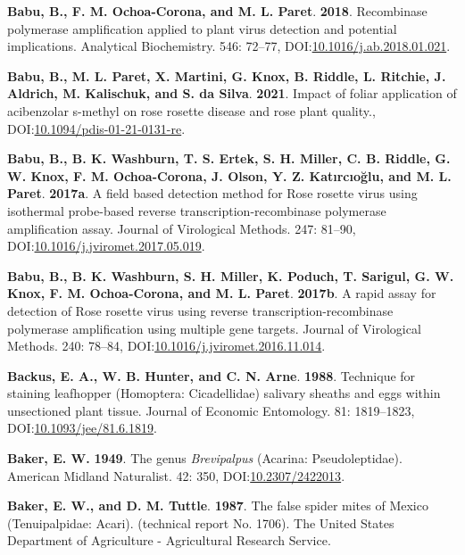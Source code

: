 \documentclass[12pt,final,CPage]{ufthesis}
\newlength{\cslhangindent}
\newenvironment{CSLReferences}[2] %
{%
	\setlength{\parindent}{0pt}
	\ifodd #1 \everypar{\setlength{\hangindent}{\cslhangindent}}\ignorespaces\fi
	\ifnum #2 > 0
	\setlength{\parskip}{#2\baselineskip}
	\fi
}%
{}
\begin{document}
{\begin{CSLReferences}{1}{0}
  \leavevmode{}%
  \textbf{Babu, B., F. M. Ochoa-Corona, and M. L. Paret}. \textbf{2018}. Recombinase polymerase amplification applied to plant virus detection and potential implications. Analytical Biochemistry. 546: 72--77, DOI:\href{https://doi.org/10.1016/j.ab.2018.01.021}{10.1016/j.ab.2018.01.021}.

  \leavevmode{}%
  \textbf{Babu, B., M. L. Paret, X. Martini, G. Knox, B. Riddle, L. Ritchie, J. Aldrich, M. Kalischuk, and S. da Silva}. \textbf{2021}. Impact of foliar application of acibenzolar s-methyl on rose rosette disease and rose plant quality., DOI:\href{https://doi.org/10.1094/pdis-01-21-0131-re}{10.1094/pdis-01-21-0131-re}.

  \leavevmode{}%
  \textbf{Babu, B., B. K. Washburn, T. S. Ertek, S. H. Miller, C. B. Riddle, G. W. Knox, F. M. Ochoa-Corona, J. Olson, Y. Z. Katırcıoğlu, and M. L. Paret}. \textbf{2017a}. A field based detection method for {Rose rosette virus} using isothermal probe-based reverse transcription-recombinase polymerase amplification assay. Journal of Virological Methods. 247: 81--90, DOI:\href{https://doi.org/10.1016/j.jviromet.2017.05.019}{10.1016/j.jviromet.2017.05.019}.

  \leavevmode{}%
  \textbf{Babu, B., B. K. Washburn, S. H. Miller, K. Poduch, T. Sarigul, G. W. Knox, F. M. Ochoa-Corona, and M. L. Paret}. \textbf{2017b}. A rapid assay for detection of {Rose rosette virus} using reverse transcription-recombinase polymerase amplification using multiple gene targets. Journal of Virological Methods. 240: 78--84, DOI:\href{https://doi.org/10.1016/j.jviromet.2016.11.014}{10.1016/j.jviromet.2016.11.014}.

  \leavevmode{}%
  \textbf{Backus, E. A., W. B. Hunter, and C. N. Arne}. \textbf{1988}. Technique for staining leafhopper ({Homoptera}: {Cicadellidae}) salivary sheaths and eggs within unsectioned plant tissue. Journal of Economic Entomology. 81: 1819--1823, DOI:\href{https://doi.org/10.1093/jee/81.6.1819}{10.1093/jee/81.6.1819}.

  \leavevmode{}%
  \textbf{Baker, E. W.} \textbf{1949}. The genus {\emph{Brevipalpus}} ({Acarina}: {Pseudoleptidae}). American Midland Naturalist. 42: 350, DOI:\href{https://doi.org/10.2307/2422013}{10.2307/2422013}.

  \leavevmode{}%
  \textbf{Baker, E. W., and D. M. Tuttle}. \textbf{1987}. The false spider mites of {Mexico} ({Tenuipalpidae}: {Acari}). (technical report No. 1706). The {United States} Department of Agriculture - Agricultural Research Service.


\end{CSLReferences}}
\end{document}
